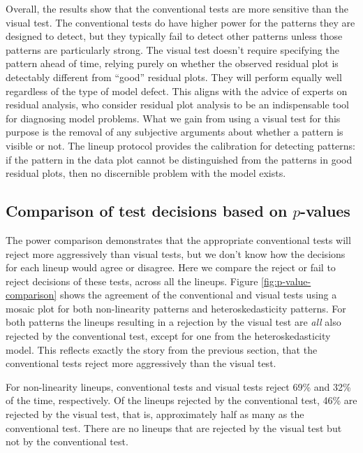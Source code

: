 \documentclass[]{interact}
\theoremstyle{plain}%
\theoremstyle{definition}
\theoremstyle{remark}
\begin{document}
Overall, the results show that the conventional tests are more sensitive
than the visual test. The conventional tests do have higher power for
the patterns they are designed to detect, but they typically fail to
detect other patterns unless those patterns are particularly strong. The
visual test doesn't require specifying the pattern ahead of time,
relying purely on whether the observed residual plot is detectably
different from ``good'' residual plots. They will perform equally well
regardless of the type of model defect. This aligns with the advice of
experts on residual analysis, who consider residual plot analysis to be
an indispensable tool for diagnosing model problems. What we gain from
using a visual test for this purpose is the removal of any subjective
arguments about whether a pattern is visible or not. The lineup protocol
provides the calibration for detecting patterns: if the pattern in the
data plot cannot be distinguished from the patterns in good residual
plots, then no discernible problem with the model exists.

\hypertarget{comparison-of-test-decisions-based-on-p-values}{%
\subsection{\texorpdfstring{Comparison of test decisions based on
\(p\)-values\label{p-value}}{Comparison of test decisions based on p-values}}\label{comparison-of-test-decisions-based-on-p-values}}

The power comparison demonstrates that the appropriate conventional
tests will reject more aggressively than visual tests, but we don't know
how the decisions for each lineup would agree or disagree. Here we
compare the reject or fail to reject decisions of these tests, across
all the lineups. Figure \ref{fig:p-value-comparison} shows the agreement
of the conventional and visual tests using a mosaic plot for both
non-linearity patterns and heteroskedasticity patterns. For both
patterns the lineups resulting in a rejection by the visual test are
\emph{all} also rejected by the conventional test, except for one from
the heteroskedasticity model. This reflects exactly the story from the
previous section, that the conventional tests reject more aggressively
than the visual test.

For non-linearity lineups, conventional tests and visual tests reject
69\% and 32\% of the time, respectively. Of the lineups rejected by the
conventional test, 46\% are rejected by the visual test, that is,
approximately half as many as the conventional test. There are no
lineups that are rejected by the visual test but not by the conventional
test.
\end{document}
